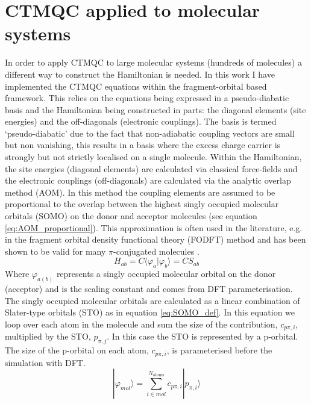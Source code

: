\chapter{CTMQC applied to molecular systems}
\label{chap:molecular_systems}
In order to apply CTMQC to large molecular systems (hundreds of molecules) a different way to construct the Hamiltonian is needed. In this work I have implemented the CTMQC equations within the fragment-orbital based framework. This relies on the equations being expressed in a pseudo-diabatic basis and the Hamiltonian being constructed in  parts: the diagonal elements (site energies) and the off-diagonals (electronic couplings). The basis is termed `pseudo-diabatic' due to the fact that non-adiabatic coupling vectors are small but non vanishing, this results in a basis where the excess charge carrier is strongly but not strictly localised on a single molecule. Within the Hamiltonian, the site energies (diagonal elements) are calculated via classical force-fields and the electronic couplings (off-diagonals) are calculated via the analytic overlap method \cite{gajdos_ultrafast_2014, spencer_fob-sh:_2016} (AOM). In this method the coupling elements are assumed to be proportional to the overlap between the highest singly occupied molecular orbitals (SOMO) on the donor and acceptor molecules (see equation \eqref{eq:AOM_proportional}). This approximation is often used in the literature, e.g. in the fragment orbital density functional theory \cite{KirkpatrickJ2008,C2CP41348E,TroisiA2002} (FODFT) method and has been shown to be valid for many $\pi$-conjugated molecules \cite{KubasA2014, gajdos_ultrafast_2014}.
\begin{equation}
  H_{ab} = C \langle \varphi_{a} | \varphi_{b} \rangle = C S_{ab}
  \label{eq:AOM_proportional}
\end{equation}
Where $\varphi_{a(b)}$ represents a singly occupied molecular orbital on the donor (acceptor) and  is the scaling constant and comes from DFT parameterisation. The singly occupied molecular orbitals are calculated as a linear combination of Slater-type orbitals (STO) as in equation  \eqref{eq:SOMO_def}. In this equation we loop over each atom in the molecule and sum the size of the contribution, $c_{p\pi, i}$, multiplied by the STO, $p_{\pi, j}$. In this case the STO is represented by a p-orbital. The size of the p-orbital on each atom, $c_{p\pi, i}$, is parameterised before the simulation with DFT.
\begin{equation}
  | \varphi_{mol} \rangle = \sum_{i \in mol}^{N_{\text{atoms}}} c_{p\pi, i} | p_{\pi, i} \rangle
  \label{eq:SOMO_def}
\end{equation}
